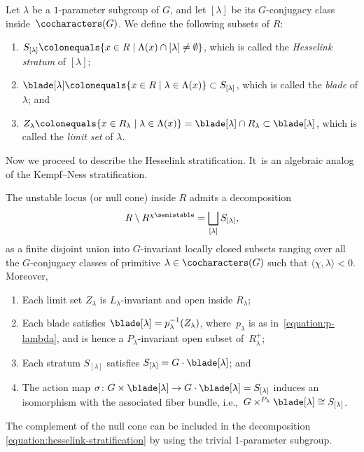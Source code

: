 \begin{definition}
Let $\lambda$ be a $1$-parameter subgroup of $G$,
and let $[\lambda]$ be its $G$\nobreakdash-conjugacy class inside~$\cocharacters(G)$.
We define the following subsets of $R$:
\begin{enumerate}
\item $S_{[\lambda]}\colonequals \{ x \in R \mid \Lambda(x) \cap [\lambda] \neq \emptyset \}$,
which is called the \emph{Hesselink stratum} of $[\lambda]$;
\item $\blade[\lambda]\colonequals \{ x \in R \mid \lambda \in \Lambda(x) \}\subset S_{[\lambda]}$,
which is called the \emph{blade} of $\lambda$; and
\item $Z_\lambda\colonequals \{ x \in R_\lambda \mid \lambda \in \Lambda(x)\} = \blade[\lambda] \cap R_\lambda\subset\blade[\lambda]$,
which is called the \emph{limit set} of $\lambda$.
\end{enumerate}
\end{definition}

Now we proceed to describe the Hesselink stratification. It~is an algebraic analog of the Kempf--Ness stratification.

\begin{theorem}[Hesselink]
\label{theorem:hesselink}
The unstable locus (or null cone) inside $R$ admits a decomposition
\begin{equation}
\label{equation:hesselink-stratification}
R\setminus R^{\chi\semistable} = \bigsqcup_{[\lambda]} S_{[\lambda]},
\end{equation}
as a finite disjoint union into $G$-invariant locally closed subsets
ranging over all the $G$-conjugacy classes of primitive $\lambda \in \cocharacters(G)$
such that $\langle \chi,\lambda \rangle < 0$.
Moreover,
\begin{enumerate}
\item Each limit set $Z_\lambda$ is $L_\lambda$-invariant and open inside $R_\lambda$;
\item Each blade satisfies $\blade[\lambda] = p_\lambda^{-1}(Z_\lambda)$,
where~$p_\lambda$ is as in~\eqref{equation:p-lambda},
and is hence a $P_\lambda$\nobreakdash-invari\-ant open subset of~$R_\lambda^+$;
\item Each stratum $S_{[\lambda]}$ satisfies $S_{[\lambda]} = G \cdot \blade[\lambda]$; and
\item The action map $\sigma\colon G\times \blade[\lambda] \to G\cdot \blade[\lambda] = S_{[\lambda]}$
induces an isomorphism with the associated fiber bundle,
i.e.,~$G\times^{P_\lambda} \blade[\lambda] \cong S_{[\lambda]}$.
\end{enumerate}
\end{theorem}
The complement of the null cone can be included in the decomposition \eqref{equation:hesselink-stratification}
by using the trivial $1$-parameter subgroup.

